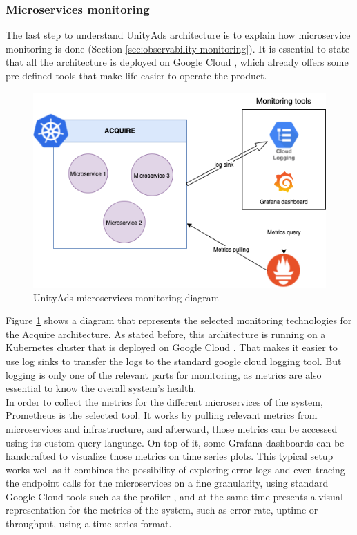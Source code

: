 \documentclass[english, 12pt, a4paper, sci, utf8, a-1b, online]{aaltothesis}
\begin{document}
\subsubsection{Microservices monitoring}

The last step to understand UnityAds architecture is to explain how microservice monitoring is done (Section \ref{sec:observability-monitoring}). It is essential to state that all the architecture is deployed on Google Cloud \cite{aceto2013cloud}, which already offers some pre-defined tools that make life easier to operate the product.\\

\begin{figure}[h]
    \centering
    \includegraphics[scale=0.4]{src/thesis/img/background/service-monitoring.png}
    \caption{UnityAds microservices monitoring diagram}
    \label{fig:background:monitoring}
\end{figure}

Figure \ref{fig:background:monitoring} shows a diagram that represents the selected monitoring technologies for the Acquire architecture. As stated before, this architecture is running on a Kubernetes cluster that is deployed on Google Cloud \cite{hunter2018google}. That makes it easier to use log sinks to transfer the logs to the standard google cloud logging tool. But logging is only one of the relevant parts for monitoring, as metrics are also essential to know the overall system's health.\\

In order to collect the metrics for the different microservices of the system, Prometheus \cite{turnbull2018monitoring} is the selected tool. It works by pulling relevant metrics from microservices and infrastructure, and afterward, those metrics can be accessed using its custom query language. On top of it, some Grafana dashboards \cite{hoang2020research} can be handcrafted to visualize those metrics on time series plots. This typical setup works well as it combines the possibility of exploring error logs and even tracing the endpoint calls for the microservices on a fine granularity, using standard Google Cloud tools such as the profiler \cite{thakurratan2018google}, and at the same time presents a visual representation for the metrics of the system, such as error rate, uptime or throughput, using a time-series format.\\
\end{document}
